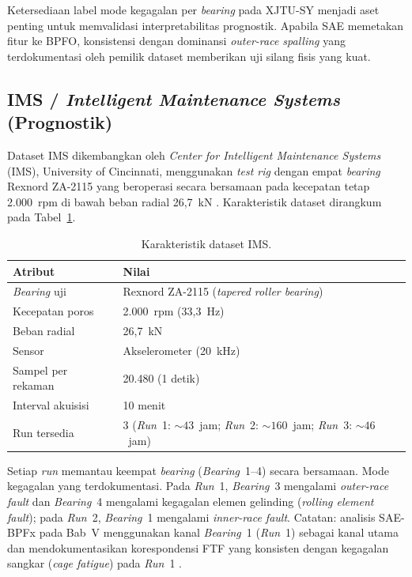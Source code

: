 Ketersediaan label mode kegagalan per \emph{bearing} pada XJTU-SY menjadi aset
penting untuk memvalidasi interpretabilitas {\color{blue}prognostik}. Apabila SAE memetakan
fitur ke BPFO, konsistensi dengan dominansi \emph{outer-race spalling} yang
terdokumentasi oleh pemilik dataset memberikan uji silang fisis yang kuat.

\subsection{IMS / \emph{Intelligent Maintenance Systems} {\color{blue}(Prognostik)}}
\label{subsec:bab3_ims}

Dataset IMS dikembangkan oleh \emph{Center for Intelligent Maintenance
Systems} (IMS), University of Cincinnati, menggunakan \emph{test rig} dengan
empat \emph{bearing} Rexnord ZA-2115 yang beroperasi secara bersamaan pada kecepatan
tetap 2.000~rpm di bawah beban radial 26,7~kN
. Karakteristik dataset dirangkum pada
Tabel~\ref{tab:bab3_ims}.

\begin{table}[ht]
\centering
\caption{Karakteristik dataset IMS.}
\label{tab:bab3_ims}
\small
\begin{tabular}{@{}ll@{}}
\toprule
\textbf{Atribut} & \textbf{Nilai} \\
\midrule
\emph{Bearing} uji       & Rexnord ZA-2115 (\emph{tapered roller bearing}) \\
Kecepatan poros    & 2.000~rpm (33,3~Hz) \\
Beban radial       & 26,7~kN \\
Sensor             & Akselerometer (20~kHz) \\
Sampel per rekaman & 20.480 (1 detik) \\
Interval akuisisi  & 10 menit \\
Run tersedia       & 3 (\emph{Run}~1: ${\sim}43$~jam; \emph{Run}~2: ${\sim}160$~jam;
                       \emph{Run}~3: ${\sim}46$~jam) \\
\bottomrule
\end{tabular}
\end{table}

Setiap \emph{run} memantau keempat \emph{bearing} (\emph{Bearing}~1–4) secara bersamaan.
Mode kegagalan yang terdokumentasi. Pada \emph{Run}~1, \emph{Bearing}~3 mengalami
\emph{outer-race fault} dan \emph{Bearing}~4 mengalami kegagalan
{\color{blue}elemen gelinding (\emph{rolling element fault})};%
pada \emph{Run}~2, \emph{Bearing}~1 mengalami
\emph{inner-race fault}. {\color{blue}Catatan: analisis SAE-BPFx pada Bab~V
menggunakan kanal \emph{Bearing}~1 (\emph{Run}~1) sebagai kanal utama dan
mendokumentasikan korespondensi FTF yang konsisten dengan kegagalan sangkar
(\emph{cage fatigue}) pada \emph{Run}~1 .}%

